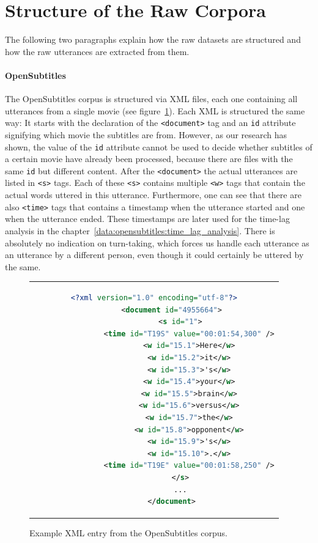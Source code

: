 \section{Structure of the Raw Corpora}
\label{data:structure_of_corpora}
The following two paragraphs explain how the raw datasets are structured and how the raw utterances are extracted from them.

\paragraph{OpenSubtitles} The OpenSubtitles corpus is structured via XML files, each one containing all utterances from a single movie (see figure~\ref{data:opensubtitles:xml_example}). Each XML is structured the same way: It starts with the declaration of the \texttt{<document>} tag and an \texttt{id} attribute signifying which movie the subtitles are from. However, as our research has shown, the value of the \texttt{id} attribute cannot be used to decide whether subtitles of a certain movie have already been processed, because there are files with the same \texttt{id} but different content. After the \texttt{<document>} the actual utterances are listed in \texttt{<s>} tags. Each of these \texttt{<s>} contains multiple \texttt{<w>} tags that contain the actual words uttered in this utterance. Furthermore, one can see that there are also \texttt{<time>} tags that contains a timestamp when the utterance started and one when the utterance ended. These timestamps are later used for the time-lag analysis in the chapter~\ref{data:opensubtitles:time_lag_analysis}. There is absolutely no indication on turn-taking, which forces us handle each utterance as an utterance by a different person, even though it could certainly be uttered by the same.\\


\begin{figure}[thp]
	\centering
	\begin{tabular}{c}  %
		\begin{lstlisting}[language=XML]
		<?xml version="1.0" encoding="utf-8"?>
		<document id="4955664">
			<s id="1">
				<time id="T19S" value="00:01:54,300" />
				<w id="15.1">Here</w>
				<w id="15.2">it</w>
				<w id="15.3">'s</w>
				<w id="15.4">your</w>
				<w id="15.5">brain</w>
				<w id="15.6">versus</w>
				<w id="15.7">the</w>
				<w id="15.8">opponent</w>
				<w id="15.9">'s</w>
				<w id="15.10">.</w>
				<time id="T19E" value="00:01:58,250" />
			</s>
			...
		</document>
		\end{lstlisting}
	\end{tabular}
	\caption{Example XML entry from the OpenSubtitles corpus.}
	\label{data:opensubtitles:xml_example}
\end{figure}

